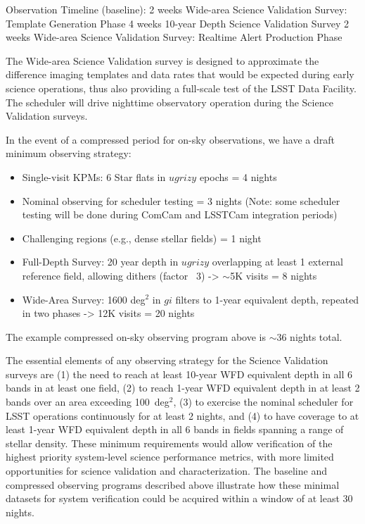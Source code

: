 Observation Timeline (baseline):
2 weeks	Wide-area Science Validation Survey: Template Generation Phase
4 weeks	10-year Depth Science Validation Survey
2 weeks	Wide-area Science Validation Survey: Realtime Alert Production Phase

The Wide-area Science Validation survey is designed to approximate the difference imaging templates and data rates that would be expected during early science operations, thus also providing a full-scale test of the LSST Data Facility. The scheduler will drive nighttime observatory operation during the Science Validation surveys.

In the event of a compressed period for on-sky observations, we have a draft minimum observing strategy:

\begin{itemize}
\item Single-visit KPMs:
        6 Star flats in $ugrizy$  epochs = 4 nights
\item Nominal observing for scheduler testing = 3 nights (Note: some scheduler testing will be done during ComCam and LSSTCam integration periods)
\item Challenging regions (e.g., dense stellar fields) = 1 night
\item Full-Depth Survey: 
        20 year depth in $ugrizy$ overlapping at least 1 external reference field, allowing dithers (factor ~3) -> $\sim$5K visits = 8 nights
\item Wide-Area Survey:
        1600 deg$^2$ in $gi$ filters to 1-year equivalent depth, repeated in two phases -> 12K visits = 20 nights
\end{itemize}

The example compressed on-sky observing program above is $\sim36$ nights total.

The essential elements of any observing strategy for the Science Validation surveys are (1) the need to reach at least 10-year WFD equivalent depth in all 6 bands in at least one field, (2) to reach 1-year WFD equivalent depth in at least 2 bands over an area exceeding 100~deg$^2$, (3) to exercise the nominal scheduler for LSST operations continuously for at least 2 nights, and (4) to have coverage to at least 1-year WFD equivalent depth in all 6 bands in fields spanning a range of stellar density. These minimum requirements would allow verification of the highest priority system-level science performance metrics, with more limited opportunities for science validation and characterization.
The baseline and compressed observing programs described above illustrate how these minimal datasets for system verification could be acquired within a window of at least 30 nights.

